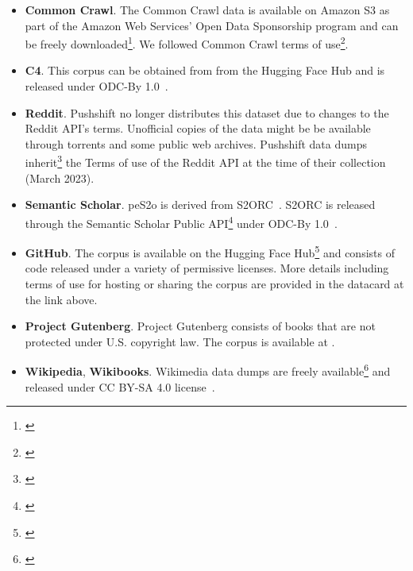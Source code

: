 \begin{itemize}[leftmargin=1em]
    \item \textbf{Common Crawl}. The Common Crawl data is available on Amazon S3 as part of the Amazon Web Services’ Open Data Sponsorship program and can be freely downloaded\footnote{\href{https://commoncrawl.org/the-data/get-started/}{}}. 
    We followed Common Crawl terms of use\footnote{\label{foot:cc-start}\href{https://commoncrawl.org/terms-of-use/}{}}.
    \item \textbf{C4}. This corpus can be obtained from from the Hugging Face Hub and is released under ODC-By 1.0~\citep{odc-by}. 
    \item \textbf{Reddit}. Pushshift no longer distributes this dataset due to changes to the Reddit API's terms. Unofficial copies of the data might be be available through torrents and some public web archives. Pushshift data dumps inherit\footnote{\href{https://www.reddit.com/r/pushshift/comments/d6luj5/comment/f0ugpqp}{}} the Terms of use of the Reddit API at the time of their collection (March 2023).
    \item \textbf{Semantic Scholar}. peS2o is derived from S2ORC~\citep{lo-etal-2020-s2orc}. S2ORC is released through the Semantic Scholar Public API\footnote{\href{https://www.semanticscholar.org/product/api}{}} under ODC-By 1.0~\citep{odc-by}.
    \item \textbf{GitHub}. The corpus is available on the Hugging Face Hub\footnote{\label{foot:stack}\href{https://huggingface.co/datasets/bigcode/the-stack-dedup}{}} and consists of code released under a variety of permissive licenses. More details including terms of use for hosting or sharing the corpus are provided in the datacard at the link above.
    \item \textbf{Project Gutenberg}. Project Gutenberg consists of books that are not protected under U.S. copyright law. The corpus is available at \href{https://www.gutenberg.org/}{}.
    \item \textbf{Wikipedia}, \textbf{Wikibooks}. Wikimedia data dumps are freely available\footnote{\label{foot:wiki}\href{https://dumps.wikimedia.org}{}} and released under CC BY-SA 4.0 license~\citep{cc-by-sa-4}.
\end{itemize}

